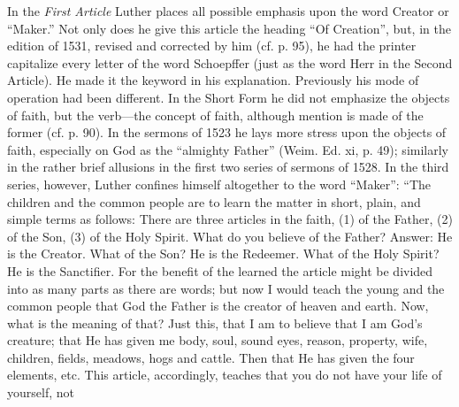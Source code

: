 In the \emph{First Article} Luther places all possible emphasis upon the word Creator or “Maker.” Not only does he give this article the heading “Of Creation”, but, in the edition of 1531, revised and corrected by him (cf. p. 95), he had the printer capitalize every letter of the word Schoepffer (just as the word Herr in the Second Article). He made it the keyword in his explanation. Previously his mode of operation had been different. In the Short Form he did not emphasize the objects of faith, but the verb—the concept of faith, although mention is made of the former (cf. p. 90). In the sermons of 1523 he lays more stress upon the objects of faith, especially on God as the “almighty Father” (Weim. Ed. xi, p. 49); similarly in the rather brief allusions in the first two series of sermons of 1528. In the third series, however, Luther confines himself altogether to the word “Maker”: “The children and the common people are to learn the matter in short, plain, and simple terms as follows: There are three articles in the faith, (1) of the Father, (2) of the Son, (3) of the Holy Spirit. What do you believe of the Father? Answer: He is the Creator. What of the Son? He is the Redeemer. What of the Holy Spirit? He is the Sanctifier. For the benefit of the learned the article might be divided into as many parts as there are words; but now I would teach the young and the common people that God the Father is the creator of heaven and earth. Now, what is the meaning of that? Just this, that I am to believe that I am God’s creature; that He has given me body, soul, sound eyes, reason, property, wife, children, fields, meadows, hogs and cattle. Then that He has given the four elements, etc. This article, accordingly, teaches that you do not have your life of yourself, not
